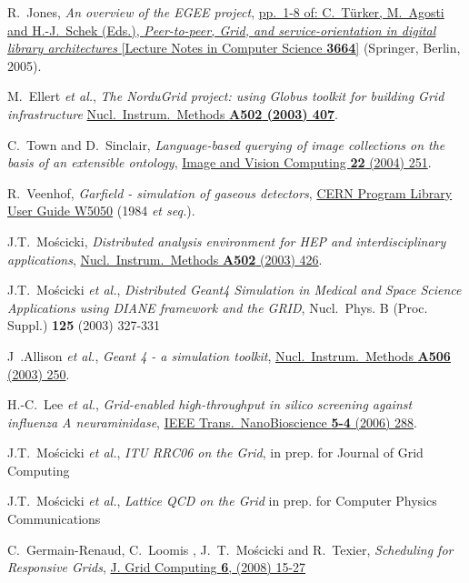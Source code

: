 \documentclass{elsart}
\def\etal {\textit{et al.}}
\begin{document}
\begin{linenumbers}
\begin{thebibliography}{00}
 R.~Jones,
\textit{An overview of the EGEE project},
\href{http://dx.doi.org/10.1007/11549819}
{pp.~1-8 of: C.~T\"urker, M.~Agosti and H.-J.~Schek (Eds.),
\textit{Peer-to-peer, Grid, and service-orientation in digital library
architectures}
[Lecture Notes in Computer Science \textbf{3664}]} (Springer, Berlin, 2005).

 M.~Ellert \etal,
\textit{The NorduGrid project: using Globus toolkit for building Grid
infrastructure}
\href{http://dx.doi.org/10.1016/S0168-9002(03)00453-4}
{Nucl.\ Instrum.\ Methods \bf{A502} (2003) 407}.

 C.~Town and D.~Sinclair,
\textit{Language-based querying of image collections on the basis of an
extensible ontology},
\href{http://dx.doi.org/10.1016/j.imavis.2003.10.002}
{Image and Vision Computing \textbf{22} (2004) 251}.

 R.~Veenhof,
\textit{Garfield - simulation of gaseous detectors},
\href{http://consult.cern.ch/writeup/garfield/}
{CERN Program Library User Guide W5050} (1984 \textit{et seq.}).

 J.T.~Mo\'scicki,
\textit{Distributed analysis environment for HEP and interdisciplinary
applications},
\href{http://dx.doi.org/10.1016/S0168-9002(03)00459-5}
{Nucl.\ Instrum.\ Methods \textbf{A502} (2003) 426}.

 J.T.~Mo\'scicki \etal,
\textit{Distributed Geant4 Simulation in Medical and Space Science Applications
using DIANE framework and the GRID},
{Nucl.\ Phys. B (Proc. Suppl.) \textbf{125} (2003) 327-331}

 J~.Allison \etal,
\textit{Geant 4 - a simulation toolkit},
\href{http://dx.doi.org/10.1016/S0168-9002(03)01368-8}
{Nucl.\ Instrum.\ Methods \textbf{A506} (2003) 250}.

 H.-C.\ Lee \etal,
\textit{Grid-enabled high-throughput in silico screening against influenza A
neuraminidase},
\href{http://dx.doi.org/10.1109/TNB.2006.887943}
{IEEE Trans.\ NanoBioscience \textbf{5-4} (2006) 288}.

 J.T.~Mo\'scicki \etal,
\textit{ITU RRC06 on the Grid},
{in prep. for Journal of Grid Computing }

 J.T.~Mo\'scicki \etal,
\textit{Lattice QCD on the Grid}
{in prep. for Computer Physics Communications}

  C.~Germain-Renaud, C.~Loomis , J.~T.~Mo{\'s}cicki and R.~Texier,
\textit{Scheduling for Responsive Grids}, 
\href{http://dx/doi.org/10.1007/s10723-007-9086-4}
{J. Grid Computing \textbf{6}, (2008) 15-27 }


\end{thebibliography}
\end{linenumbers}
\end{document}
